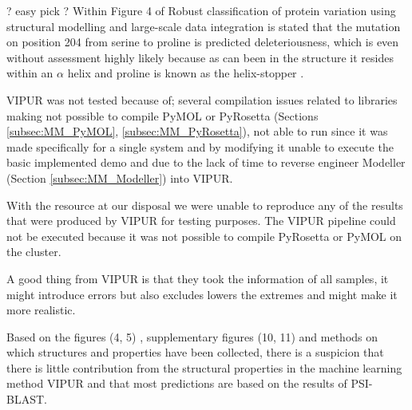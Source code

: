 
? easy pick ?
Within Figure 4 of Robust classification of protein variation using structural modelling and large-scale data integration \cite{} is stated that the mutation on position 204 from serine to proline is predicted deleteriousness, which is even without assessment highly likely because as can been in the structure it resides within an $\alpha$ helix and proline is known as the helix-stopper \cite{}.

VIPUR was not tested because of; several compilation issues related to libraries making not possible to compile PyMOL or PyRosetta (Sections \ref{subsec:MM_PyMOL}, \ref{subsec:MM_PyRosetta}), not able to run since it was made specifically for a single system and by modifying it unable to execute the basic implemented demo and due to the lack of time to reverse engineer Modeller (Section \ref{subsec:MM_Modeller}) into VIPUR. 


With the resource at our disposal we were unable to reproduce any of the results that were produced by VIPUR for testing purposes.
The VIPUR pipeline could not be executed because it was not possible to compile PyRosetta or PyMOL on the cluster.

A good thing from VIPUR is that they took the information of all samples, it might introduce errors but also excludes lowers the extremes and might make it more realistic.


Based on the figures (4, 5) \cite{}, supplementary figures  (10, 11) \cite{} and methods on which structures and properties have been collected, there is a suspicion that there is little contribution from the structural properties in the machine learning method VIPUR and that most predictions are based on the results of PSI-BLAST.

